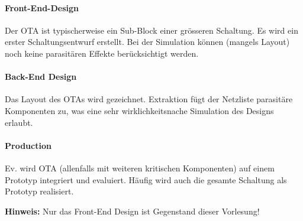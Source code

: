 \begin{minipage}[t]{0.38\columnwidth}   %
    \raggedright

    \paragraph{Front-End-Design}
    Der OTA ist typischerweise ein Sub-Block einer grösseren Schaltung.
    Es wird ein erster Schaltungsentwurf erstellt.
    Bei der Simulation können (mangels Layout) noch keine parasitären Effekte berücksichtigt werden.

    \medskip

    \paragraph{Back-End Design}
    Das Layout des OTAs wird gezeichnet. 
    Extraktion fügt der Netzliste parasitäre Komponenten zu, was eine sehr wirklichkeitsnache Simulation des Designs erlaubt.

    \medskip

    \paragraph{Production}
    Ev. wird OTA (allenfalls mit weiteren kritischen Komponenten) auf einem Prototyp integriert und evaluiert.
    Häufig wird auch die gesamte Schaltung als Prototyp realisiert. 

    \medskip

    \textbf{Hinweis:} Nur das Front-End Design ist Gegenstand dieser Vorlesung!
\end{minipage}




